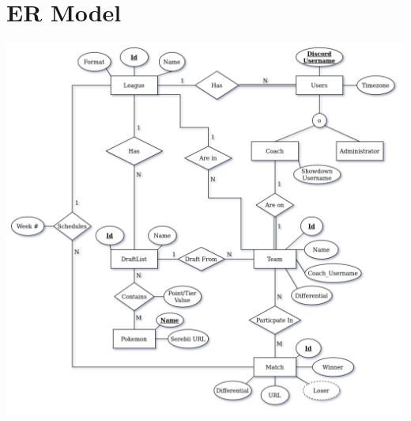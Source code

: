 \documentclass{article}
\begin{document}
\section*{ER Model}
\includegraphics[scale=.35]{PokemonDraftLeagueDB_final.png}
\end{document}
